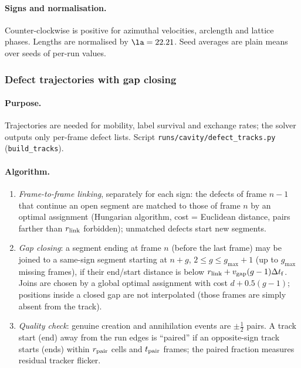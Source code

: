 \paragraph{Signs and normalisation.} Counter-clockwise is positive for azimuthal velocities, arclength and lattice phases. Lengths are
normalised by $\la=22.21$. Seed averages are plain means over seeds of per-run values.

\subsubsection{Defect trajectories with gap closing}
\label{sec:md-tracks}

\paragraph{Purpose.} Trajectories are needed for mobility, label survival and exchange rates; the solver outputs only per-frame
defect lists. Script \texttt{runs/cavity/defect\_tracks.py} (\texttt{build\_tracks}).

\paragraph{Algorithm.}
\begin{enumerate}
\item \emph{Frame-to-frame linking}, separately for each sign: the defects of frame $n-1$ that continue an open segment are matched to
  those of frame $n$ by an optimal assignment (Hungarian algorithm, cost = Euclidean distance, pairs farther than $r_{\rm link}$ forbidden);
  unmatched defects start new segments.
\item \emph{Gap closing}: a segment ending at frame $n$ (before the last frame) may be joined to a same-sign segment starting at $n+g$,
  $2\le g\le g_{\max}+1$ (up to $g_{\max}$ missing frames), if their end/start distance is below
  $r_{\rm link}+v_{\rm gap}(g-1)\Delta t_{\rm f}$. Joins are chosen by a global optimal assignment with cost
  $d+0.5(g-1)$; positions inside a closed gap are not interpolated (those frames are simply absent from the track).
\item \emph{Quality check}: genuine creation and annihilation events are $\pm\tfrac12$ pairs. A track start (end) away from the run edges is
  ``paired'' if an opposite-sign track starts (ends) within $r_{\rm pair}$ cells and $t_{\rm pair}$ frames; the paired fraction measures residual
  tracker flicker.
\end{enumerate}

